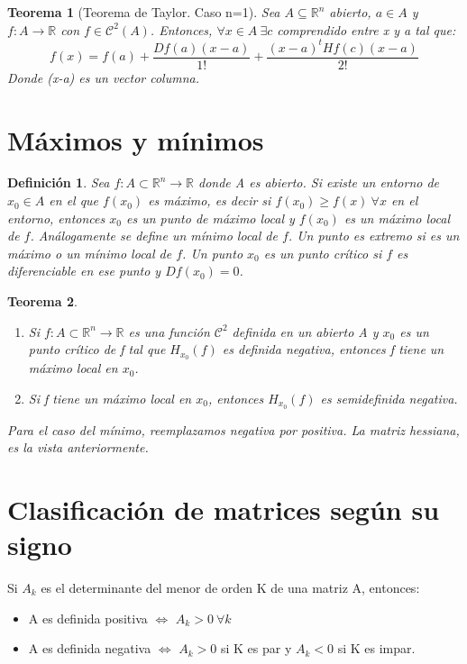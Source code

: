 \documentclass[11pt, a4paper]{article}
\newcommand{\R}{\mathbb{R}}
\theoremstyle{theorem-style}
\newtheorem*{nth}{Teorema}
\theoremstyle{definition-style}
\newtheorem*{ndef}{Definición}
\theoremstyle{remark-style}
\theoremstyle{example-style}
\newenvironment{nlist}
{\begin{enumerate}
\renewcommand\labelenumi{(\emph{\roman{enumi})}}}
{\end{enumerate}}
\begin{document}
\begin{nth}[Teorema de Taylor. Caso n=1]
	Sea $A \subseteq \R^n$ abierto, $a \in A$ y $f:A \to \R$ con $f\in \mathcal{C}^2(A)$. Entonces, $\forall x \in A \ \exists c$ comprendido entre x y a tal que:
	\[
	f(x) = f(a) + \frac{Df(a)(x-a)}{1!} + \frac{(x-a)^t Hf(c)(x-a)}{2!}
	\]
	Donde (x-a) es un vector columna.
\end{nth}


\section{Máximos y mínimos}

\begin{ndef}
	Sea $f:A\subset \R^n \to \R$ donde A es abierto. Si existe un entorno de $x_0 \in A$ en el que $f(x_0)$ es máximo, es decir si $f(x_0) \geq f(x) \ \forall x$ en el entorno, entonces $x_0$ es un punto de máximo local y $f(x_0)$ es un máximo local de $f$. Análogamente se define un mínimo local de $f$. Un punto es extremo si es un máximo o un mínimo local de $f$. Un punto $x_0$ es un punto crítico si $f$ es diferenciable en ese punto y $Df(x_0) = 0$.
\end{ndef}

\begin{nth}\hfill
	\begin{nlist}
	\item Si $f:A \subset \R^n\to \R$ es una función $\mathcal{C}^2$ definida en un abierto A y $x_0$ es un punto crítico de f tal que $H_{x_0}(f)$ es definida negativa, entonces f tiene un máximo local en $x_0$.
	\item Si f tiene un máximo local en $x_0$, entonces $H_{x_0}(f) $ es semidefinida negativa.
\end{nlist}
Para el caso del mínimo, reemplazamos negativa por positiva. La matriz hessiana, es la vista anteriormente.
\end{nth}

\section{Clasificación de matrices según su signo}
 Si $A_k$ es el determinante del menor de orden K de una matriz A, entonces:
 \begin{itemize}
	\item A es definida positiva $\iff$ $A_k > 0 \ \forall k$
	\item A es definida negativa $\iff$ $A_k > 0$ si K es par y $A_k < 0 $ si K es impar.
\end{itemize}
\end{document}
